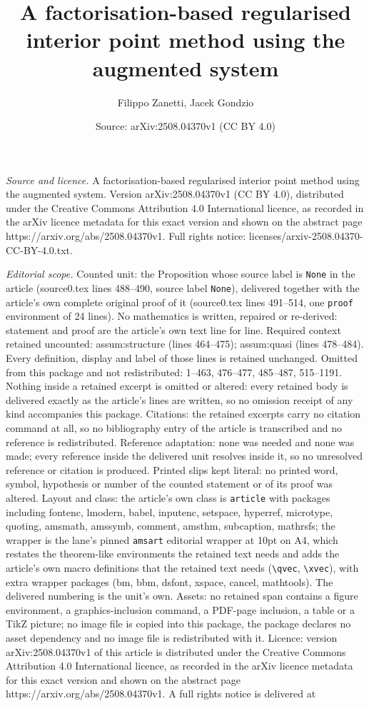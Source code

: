 \documentclass[10pt,a4paper]{amsart}
\title[A factorisation-based regularised interior point method usin]{A factorisation-based regularised interior point method using the augmented system}
\author{Filippo Zanetti, Jacek Gondzio}
\date{Source: arXiv:2508.04370v1 (CC BY 4.0)}
\begin{document}
\maketitle

\noindent\emph{Source and licence.} A factorisation-based regularised interior point method using the augmented system. Version arXiv:2508.04370v1 (CC BY 4.0), distributed under the Creative Commons Attribution 4.0 International licence, as recorded in the arXiv licence metadata for this exact version and shown on the abstract page https://arxiv.org/abs/2508.04370v1. Full rights notice: licenses/arxiv-2508.04370-CC-BY-4.0.txt.\par\smallskip

\noindent\textit{Editorial scope.} Counted unit: the Proposition whose source label is \texttt{None} in the article (source0.tex lines 488--490, source label \texttt{None}), delivered together with the article's own complete original proof of it (source0.tex lines 491--514, one \texttt{proof} environment of 24 lines). No mathematics is written, repaired or re-derived: statement and proof are the article's own text line for line. Required context retained uncounted: assum:structure (lines 464--475); assum:quasi (lines 478--484). Every definition, display and label of those lines is retained unchanged. Omitted from this package and not redistributed: 1--463, 476--477, 485--487, 515--1191. Nothing inside a retained excerpt is omitted or altered: every retained body is delivered exactly as the article's lines are written, so no omission receipt of any kind accompanies this package. Citations: the retained excerpts carry no citation command at all, so no bibliography entry of the article is transcribed and no reference is redistributed. Reference adaptation: none was needed and none was made; every reference inside the delivered unit resolves inside it, so no unresolved reference or citation is produced. Printed slips kept literal: no printed word, symbol, hypothesis or number of the counted statement or of its proof was altered. Layout and class: the article's own class is \texttt{article} with packages including fontenc, lmodern, babel, inputenc, setspace, hyperref, microtype, quoting, amsmath, amssymb, comment, amsthm, subcaption, mathrsfs; the wrapper is the lane's pinned \texttt{amsart} editorial wrapper at 10pt on A4, which restates the theorem-like environments the retained text needs and adds the article's own macro definitions that the retained text needs (\texttt{\textbackslash qvec}, \texttt{\textbackslash xvec}), with extra wrapper packages (bm, bbm, dsfont, xspace, cancel, mathtools). The delivered numbering is the unit's own. Assets: no retained span contains a figure environment, a graphics-inclusion command, a PDF-page inclusion, a table or a TikZ picture; no image file is copied into this package, the package declares no asset dependency and no image file is redistributed with it. Licence: version arXiv:2508.04370v1 of this article is distributed under the Creative Commons Attribution 4.0 International licence, as recorded in the arXiv licence metadata for this exact version and shown on the abstract page https://arxiv.org/abs/2508.04370v1. A full rights notice is delivered at 
\end{document}
